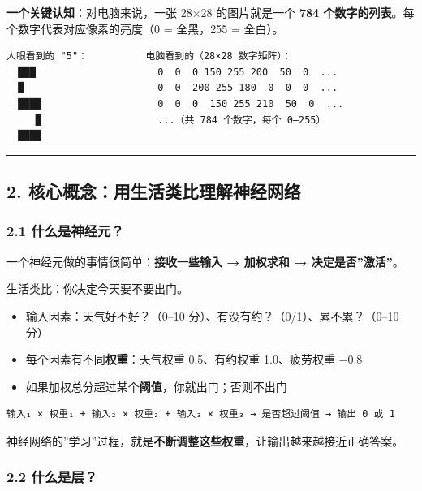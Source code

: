 \documentclass[
  11pt,
]{ctexart}
\providecommand{\tightlist}{%
  \setlength{\itemsep}{0pt}\setlength{\parskip}{0pt}}
\begin{document}
\textbf{一个关键认知}：对电脑来说，一张 28×28 的图片就是一个 \textbf{784
个数字的列表}。每个数字代表对应像素的亮度（0 = 全黑，255 = 全白）。

\begin{verbatim}
人眼看到的 "5"：          电脑看到的（28×28 数字矩阵）：
  ███                     0  0  0 150 255 200  50  0  ...
  █                       0  0  200 255 180  0  0  0  ...
  ████                    0  0  0  150 255 210  50  0  ...
     █                    ...（共 784 个数字，每个 0–255）
  ████
\end{verbatim}

\begin{center}\rule{0.5\linewidth}{0.5pt}\end{center}

\subsection{2.
核心概念：用生活类比理解神经网络}\label{ux6838ux5fc3ux6982ux5ff5ux7528ux751fux6d3bux7c7bux6bd4ux7406ux89e3ux795eux7ecfux7f51ux7edc}

\subsubsection{2.1
什么是神经元？}\label{ux4ec0ux4e48ux662fux795eux7ecfux5143}

一个神经元做的事情很简单：\textbf{接收一些输入 → 加权求和 →
决定是否”激活”}。

生活类比：你决定今天要不要出门。

\begin{itemize}
\tightlist
\item
  输入因素：天气好不好？（0–10 分）、有没有约？（0/1）、累不累？（0–10
  分）
\item
  每个因素有不同\textbf{权重}：天气权重 0.5、有约权重 1.0、疲劳权重 −0.8
\item
  如果加权总分超过某个\textbf{阈值}，你就出门；否则不出门
\end{itemize}

\begin{verbatim}
输入₁ × 权重₁ + 输入₂ × 权重₂ + 输入₃ × 权重₃ → 是否超过阈值 → 输出 0 或 1
\end{verbatim}

神经网络的”学习”过程，就是\textbf{不断调整这些权重}，让输出越来越接近正确答案。

\subsubsection{2.2 什么是层？}\label{ux4ec0ux4e48ux662fux5c42}
\end{document}
